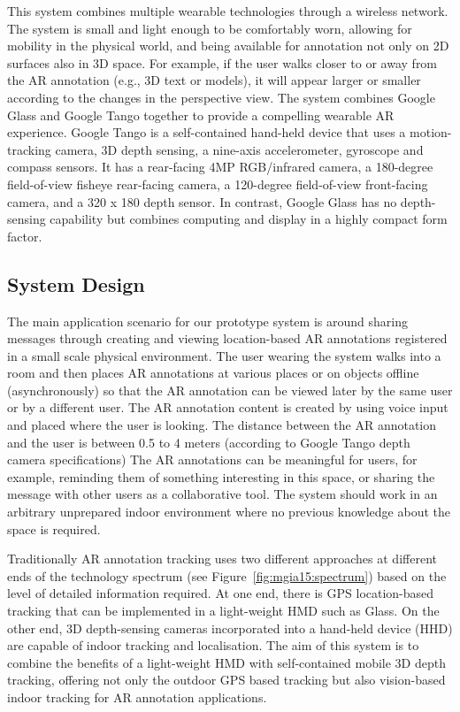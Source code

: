 This system combines multiple wearable technologies through a wireless network. The system is small and light enough to be comfortably worn, allowing for mobility in the physical world, and being available for annotation not only on 2D surfaces also in 3D space. For example, if the user walks closer to or away from the AR annotation (e.g., 3D text or models), it will appear larger or smaller according to the changes in the perspective view. The system combines Google Glass and Google Tango together to provide a compelling wearable AR experience. Google Tango is a self-contained hand-held device that uses a motion-tracking camera, 3D depth sensing, a nine-axis accelerometer, gyroscope and compass sensors. It has a rear-facing 4MP RGB/infrared camera, a 180-degree field-of-view fisheye rear-facing camera, a 120-degree field-of-view front-facing camera, and a 320 x 180 depth sensor. In contrast, Google Glass has no depth-sensing capability but combines computing and display in a highly compact form factor. 



\subsection{System Design}

The main application scenario for our prototype system is around sharing messages through creating and viewing location-based AR annotations registered in a small scale physical environment. The user wearing the system walks into a room and then places AR annotations at various places or on objects offline (asynchronously) so that the AR annotation can be viewed later by the same user or by a different user. The AR annotation content is created by using voice input and placed where the user is looking. The distance between the AR annotation and the user is between 0.5 to 4 meters (according to Google Tango depth camera specifications) The AR annotations can be meaningful for users, for example, reminding them of something interesting in this space, or sharing the message with other users as a collaborative tool. The system should work in an arbitrary unprepared indoor environment where no previous knowledge about the space is required. 

Traditionally AR annotation tracking uses two different approaches at different ends of the technology spectrum (see Figure~\ref{fig:mgia15:spectrum}) based on the level of detailed information required. At one end, there is GPS location-based tracking that can be implemented in a light-weight HMD such as Glass. On the other end, 3D depth-sensing cameras incorporated into a hand-held device (HHD) are capable of indoor tracking and localisation. The aim of this system is to combine the benefits of a light-weight HMD with self-contained mobile 3D depth tracking, offering not only the outdoor GPS based tracking but also vision-based indoor tracking for AR annotation applications. 

